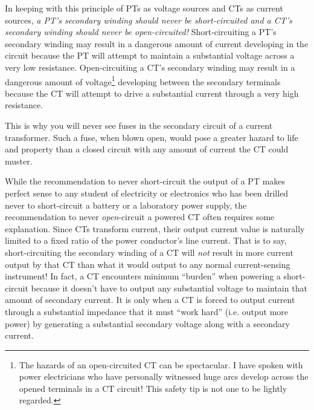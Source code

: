 \vskip 10pt

\filbreak

In keeping with this principle of PTs as voltage sources and CTs as current sources, \textit{a PT's secondary winding should never be short-circuited and a CT's secondary winding should never be open-circuited!}  Short-circuiting a PT's secondary winding may result in a dangerous amount of current developing in the circuit because the PT will attempt to maintain a substantial voltage across a very low resistance.  Open-circuiting a CT's secondary winding may result in a dangerous amount of voltage\footnote{The hazards of an open-circuited CT can be spectacular.  I have spoken with power electricians who have personally witnessed huge arcs develop across the opened terminals in a CT circuit!  This safety tip is not one to be lightly regarded.} developing between the secondary terminals because the CT will attempt to drive a substantial current through a very high resistance.      

This is why you will never see fuses in the secondary circuit of a current transformer.  Such a fuse, when blown open, would pose a greater hazard to life and property than a closed circuit with any amount of current the CT could muster.

\vskip 10pt

While the recommendation to never short-circuit the output of a PT makes perfect sense to any student of electricity or electronics who has been drilled never to short-circuit a battery or a laboratory power supply, the recommendation to never \textit{open}-circuit a powered CT often requires some explanation.  Since CTs transform current, their output current value is naturally limited to a fixed ratio of the power conductor's line current.  That is to say, short-circuiting the secondary winding of a CT will \textit{not} result in more current output by that CT than what it would output to any normal current-sensing instrument!  In fact, a CT encounters minimum ``burden'' when powering a short-circuit because it doesn't have to output any substantial voltage to maintain that amount of secondary current.  It is only when a CT is forced to output current through a substantial impedance that it must ``work hard'' (i.e. output more power) by generating a substantial secondary voltage along with a secondary current.

